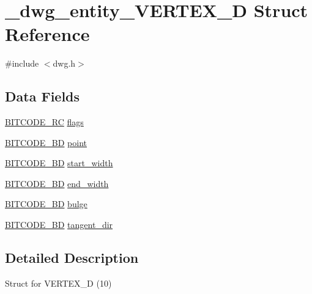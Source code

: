 \hypertarget{struct__dwg__entity__VERTEX__2D}{\section{\-\_\-dwg\-\_\-entity\-\_\-\-V\-E\-R\-T\-E\-X\-\_\-D \-Struct \-Reference}
\label{struct__dwg__entity__VERTEX__2D}
}


{\ttfamily \#include $<$dwg.\-h$>$}

\subsection*{\-Data \-Fields}
\begin{DoxyCompactItemize}
\item 
\hyperlink{dwg_8h_a7fd199a8f9c9cc52bdab220f65a2a619}{\-B\-I\-T\-C\-O\-D\-E\-\_\-\-R\-C} \hyperlink{struct__dwg__entity__VERTEX__2D_a32cb5665b09a859a181f80098cfbc202}{flags}
\item 
\hyperlink{dwg_8h_a00698ef1bb072aa0a9360c6fc1c57587}{\-B\-I\-T\-C\-O\-D\-E\-\_\-B\-D} \hyperlink{struct__dwg__entity__VERTEX__2D_a1b4bcccc88b5d5822614207fc1666a6a}{point}
\item 
\hyperlink{dwg_8h_a3c1e6781466b74ba07785d57da70ed97}{\-B\-I\-T\-C\-O\-D\-E\-\_\-\-B\-D} \hyperlink{struct__dwg__entity__VERTEX__2D_a5b903847c861d18dfc8b6bbdcac817af}{start\-\_\-width}
\item 
\hyperlink{dwg_8h_a3c1e6781466b74ba07785d57da70ed97}{\-B\-I\-T\-C\-O\-D\-E\-\_\-\-B\-D} \hyperlink{struct__dwg__entity__VERTEX__2D_aad06b67a934877e27c2b8038d22e5081}{end\-\_\-width}
\item 
\hyperlink{dwg_8h_a3c1e6781466b74ba07785d57da70ed97}{\-B\-I\-T\-C\-O\-D\-E\-\_\-\-B\-D} \hyperlink{struct__dwg__entity__VERTEX__2D_a9025a561552ceea9149cd9624683785c}{bulge}
\item 
\hyperlink{dwg_8h_a3c1e6781466b74ba07785d57da70ed97}{\-B\-I\-T\-C\-O\-D\-E\-\_\-\-B\-D} \hyperlink{struct__dwg__entity__VERTEX__2D_a2ef36a46c0c80c70974a6e2cb6ee5830}{tangent\-\_\-dir}
\end{DoxyCompactItemize}


\subsection{\-Detailed \-Description}
\-Struct for \-V\-E\-R\-T\-E\-X\-\_\-D (10) 

